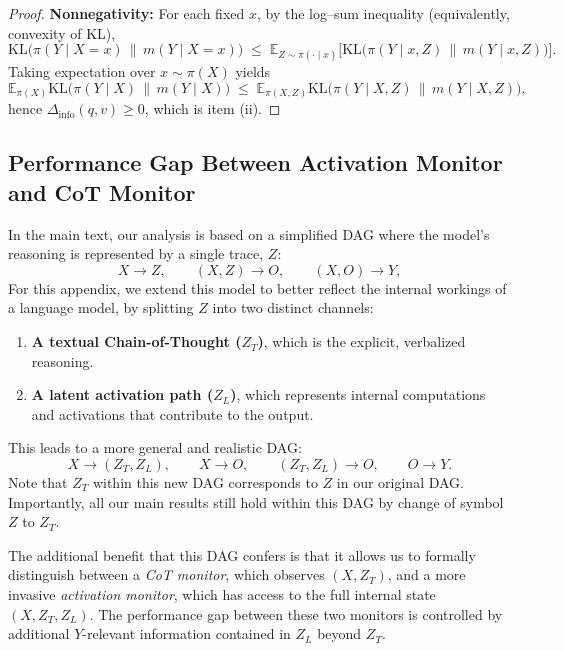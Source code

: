 \documentclass{article}
\theoremstyle{plain}
\begin{document}
\begin{proof}
\textbf{Nonnegativity:}
For each fixed $x$, by the log–sum inequality (equivalently, convexity of KL),
\[
\mathrm{KL}\!\big(\pi(Y\mid X=x)\,\|\,m(Y\mid X=x)\big)
\;\le\;
\mathbb{E}_{Z\sim \pi(\cdot\mid x)}\!\Big[
\mathrm{KL}\big(\pi(Y\mid x,Z)\,\|\,m(Y\mid x,Z)\big)
\Big].
\]
Taking expectation over $x\sim \pi(X)$ yields
\[
\mathbb{E}_{\pi(X)} \mathrm{KL}\!\big(\pi(Y\mid X)\,\|\,m(Y\mid X)\big)
\;\le\;
\mathbb{E}_{\pi(X,Z)} \mathrm{KL}\!\big(\pi(Y\mid X,Z)\,\|\,m(Y\mid X,Z)\big),
\]
hence $\Delta_{\mathrm{info}}(q,v)\ge 0$, which is item (ii).
\end{proof}

\subsection{Performance Gap Between Activation Monitor and CoT Monitor}
In the main text, our analysis is based on a simplified DAG where the model's reasoning is represented by a single trace, \(Z\):
\[
X \to Z,\qquad (X,Z)\to O,\qquad (X,O)\to Y,
\]
For this appendix, we extend this model to better reflect the internal workings of a language model, by splitting \(Z\) into two distinct channels:
\begin{enumerate}
    \item \textbf{A textual Chain-of-Thought (\(Z_T\))}, which is the explicit, verbalized reasoning.
    \item \textbf{A latent activation path (\(Z_L\))}, which represents internal computations and activations that contribute to the output.
\end{enumerate}
This leads to a more general and realistic DAG:
\[
X \to (Z_T,Z_L),\qquad X \to O,\qquad (Z_T,Z_L) \to O,\qquad O \to Y.
\]
Note that \(Z_T\) within this new DAG corresponds to \(Z\) in our original DAG.
Importantly, all our main results still hold within this DAG by change of symbol \(Z\) to \(Z_T\).

The additional benefit that this DAG confers is that it allows us to formally distinguish between a \textit{CoT monitor}, which observes \((X,Z_T)\), and a more invasive \textit{activation monitor}, which has access to the full internal state \((X,Z_T,Z_L)\).
The performance gap between these two monitors is controlled by additional \(Y\)-relevant information contained in \(Z_L\) beyond \(Z_T\).
\end{document}
